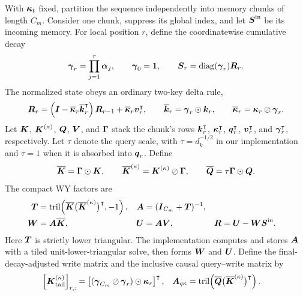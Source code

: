 \documentclass[11pt,letterpaper,logo]{yalearxiv}
\begin{document}
With $\boldsymbol{\kappa}_t$ fixed, partition the sequence independently into memory chunks of length
$C_m$. Consider one chunk, suppress its global index, and let $\boldsymbol{S}^{\mathrm{in}}$ be its
incoming memory. For local position $r$, define the coordinatewise cumulative decay
\begin{equation}
  \boldsymbol{\gamma}_r=\prod_{j=1}^{r}\boldsymbol{\alpha}_j,
  \qquad
  \boldsymbol{\gamma}_0=\boldsymbol{1},
  \qquad
  \boldsymbol{S}_r=\operatorname{diag}(\boldsymbol{\gamma}_r)\boldsymbol{R}_r.
  \label{eq:chunk-memory-normalization}
\end{equation}
The normalized state obeys an ordinary two-key delta rule,
\begin{equation}
  \boldsymbol{R}_r
  =\left(\boldsymbol{I}-\overline{\boldsymbol{\kappa}}_r\overline{\boldsymbol{k}}_r^{\intercal}\right)
    \boldsymbol{R}_{r-1}
   +\overline{\boldsymbol{\kappa}}_r\boldsymbol{v}_r^{\intercal},
  \qquad
  \overline{\boldsymbol{k}}_r=\boldsymbol{\gamma}_r\odot\boldsymbol{k}_r,
  \qquad
  \overline{\boldsymbol{\kappa}}_r=\boldsymbol{\kappa}_r\oslash\boldsymbol{\gamma}_r.
  \label{eq:chunk-memory-normalized-recurrence}
\end{equation}
Let $\boldsymbol{K}$, $\boldsymbol{K}^{(\kappa)}$, $\boldsymbol{Q}$, $\boldsymbol{V}$, and $\boldsymbol{\Gamma}$ stack the chunk's
rows $\boldsymbol{k}_r^{\intercal}$, $\boldsymbol{\kappa}_r^{\intercal}$, $\boldsymbol{q}_r^{\intercal}$, $\boldsymbol{v}_r^{\intercal}$, and
$\boldsymbol{\gamma}_r^{\intercal}$, respectively. Let $\tau$ denote the query scale, with
$\tau=d_k^{-1/2}$ in our implementation and $\tau=1$ when it is absorbed into $\boldsymbol{q}_r$. Define
\begin{equation}
  \overline{\boldsymbol{K}}=\boldsymbol{\Gamma}\odot\boldsymbol{K},
  \qquad
  \overline{\boldsymbol{K}}^{(\kappa)}=\boldsymbol{K}^{(\kappa)}\oslash\boldsymbol{\Gamma},
  \qquad
  \overline{\boldsymbol{Q}}=\tau\boldsymbol{\Gamma}\odot\boldsymbol{Q}.
  \label{eq:chunk-memory-scaled-keys}
\end{equation}
The compact WY factors are
\begin{equation}
\begin{aligned}
  \boldsymbol{T}
  &=\operatorname{tril}\!\left(
      \overline{\boldsymbol{K}}\bigl(\overline{\boldsymbol{K}}^{(\kappa)}\bigr)^{\intercal},-1
    \right),
  &
  \boldsymbol{A}&=(\boldsymbol{I}_{C_m}+\boldsymbol{T})^{-1},
  \\
  \boldsymbol{W}&=\boldsymbol{A}\overline{\boldsymbol{K}},
  &
  \boldsymbol{U}&=\boldsymbol{A}\boldsymbol{V},
  &
  \boldsymbol{R}&=\boldsymbol{U}-\boldsymbol{W}\boldsymbol{S}^{\mathrm{in}}.
\end{aligned}
  \label{eq:chunk-memory-wy}
\end{equation}
Here $\boldsymbol{T}$ is strictly lower triangular. The implementation computes and stores $\boldsymbol{A}$ with a
tiled unit-lower-triangular solve, then forms $\boldsymbol{W}$ and $\boldsymbol{U}$. Define the
final-decay-adjusted write matrix and the inclusive causal query--write matrix by
\begin{equation}
\begin{aligned}
  \left[\boldsymbol{K}_{\mathrm{tail}}^{(\kappa)}\right]_{r,:}
  &=\left[
      (\boldsymbol{\gamma}_{C_m}\oslash\boldsymbol{\gamma}_r)\odot\boldsymbol{\kappa}_r
    \right]^{\intercal},
  &
  \boldsymbol{A}_{q\kappa}
  &=\operatorname{tril}\!\left(
      \overline{\boldsymbol{Q}}\bigl(\overline{\boldsymbol{K}}^{(\kappa)}\bigr)^{\intercal}
    \right).
\end{aligned}
  \label{eq:chunk-memory-tail-output}
\end{equation}
\end{document}
